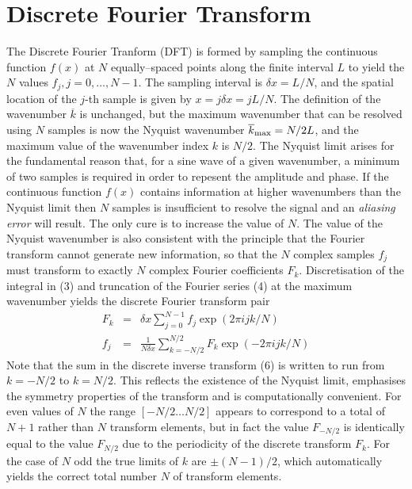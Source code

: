 \documentclass[dvips]{article}
\begin{document}
\section*{Discrete Fourier Transform}
The Discrete Fourier Tranform (DFT) is formed by sampling the
continuous function $f(x)$ at $N$ equally--spaced points
along the finite interval $L$ to yield the $N$ values
$f_{j}, j=0,\ldots ,N-1$.
The sampling interval is $\delta x = L/N$, and the
spatial location of the $j$-th sample is given by $x = j\delta x = jL/N$.
The definition of the wavenumber $\overline{k}$ is unchanged, but the
maximum wavenumber that can be resolved using $N$ samples
is now the Nyquist wavenumber $\overline{k}_{\rm max} = N/2L$, and the
maximum value of the wavenumber index $k$ is $N/2$.  The Nyquist
limit arises for the fundamental reason that, for a sine wave of a given
wavenumber, a minimum
of two samples is required in order to repesent the amplitude and phase.
If the continuous function $f(x)$
contains information at higher wavenumbers than the Nyquist limit then $N$
samples is insufficient to resolve the signal and an {\it aliasing error}
will result.  The only cure is to increase the value of $N$.  
The value of the Nyquist wavenumber is also
consistent with the principle
that the Fourier transform cannot generate new information, so that the $N$
complex samples $f_{j}$ must transform to exactly $N$ complex 
Fourier coefficients $F_{k}$.  
Discretisation of the integral in (3) and truncation of the Fourier series
(4) at the maximum wavenumber yields
the discrete Fourier transform pair
\begin{eqnarray}
F_{k} & = & \delta x \sum_{j=0}^{N-1} f_{j} \exp{(2\pi ijk/N)} \\
f_{j} & = & \frac{1}{N\delta x}\sum_{k=-N/2}^{N/2} F_{k} \exp{(-2\pi ijk/N)} 
\end{eqnarray}
Note that the sum in the discrete inverse transform (6) is written to
run from $k=-N/2$ to $k=N/2$.  This reflects the existence of the
Nyquist limit, emphasises the symmetry properties of the transform and
is computationally convenient.  
For even values of $N$ the range $[-N/2\ldots N/2]$ appears to
correspond to a total of $N+1$ rather than $N$ transform elements,
but in fact the value
$F_{-N/2}$ is identically equal to the value $F_{N/2}$ due to the
periodicity of the discrete transform $F_{k}$.
For the case of $N$ odd the true limits of $k$ are $\pm (N-1)/2$, which
automatically yields the correct total number $N$ of transform elements.
\end{document}
